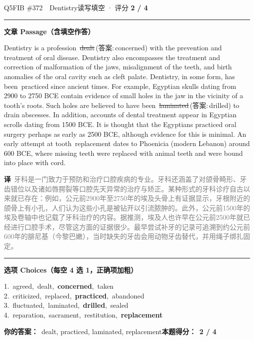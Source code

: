 \documentclass[11pt]{article}
\newcommand{\ptesub}[1]{%
  \par\needspace{2\baselineskip}\smallskip
  {\color{cAccent}\rule[-0.2ex]{3pt}{1.05em}}\hspace{6pt}%
  {\bfseries\color{cHead}#1}\par\nopagebreak\smallskip}
\newcommand{\zh}[1]{{\footnotesize\textcolor{cNote}{\textbf{译}}\ \textcolor{gray}{#1}}}
\newcommand{\rok}[1]{{\color{cFix}\ding{51}\,#1}}                 %
\newcommand{\rno}[2]{{\color{cWrong}\ding{55}\,\sout{#1}}\,{\footnotesize\color{cFix}(答案:\,#2)}}  %
\begin{document}
\begin{qblock}{Q5\quad FIB \#372\ \ Dentistry}{读写填空 · 评分 \textcolor{cAccent}{\bfseries 2 / 4}}
\ptesub{文章 Passage（含填空作答）}
\begin{promptbox}
Dentistry is a profession \rno{dealt}{concerned} with the prevention and treatment of oral disease. Dentistry also encompasses the treatment and correction of malformation of the jaws, misalignment of the teeth, and birth anomalies of the oral cavity such as cleft palate. Dentistry, in some form, has been \rok{practiced} since ancient times. For example, Egyptian skulls dating from 2900 to 2750 BCE contain evidence of small holes in the jaw in the vicinity of a tooth's roots. Such holes are believed to have been \rno{laminated}{drilled} to drain abscesses. In addition, accounts of dental treatment appear in Egyptian scrolls dating from 1500 BCE. It is thought that the Egyptians practiced oral surgery perhaps as early as 2500 BCE, although evidence for this is minimal. An early attempt at tooth \rok{replacement} dates to Phoenicia (modern Lebanon) around 600 BCE, where missing teeth were replaced with animal teeth and were bound into place with cord.
\end{promptbox}
\zh{牙科是一门致力于预防和治疗口腔疾病的专业。牙科还涵盖了对颌骨畸形、牙齿错位以及诸如唇腭裂等口腔先天异常的治疗与矫正。某种形式的牙科诊疗自古以来就已存在：例如，公元前2900年至2750年的埃及头骨上有证据显示，牙根附近的颌骨上有小孔，人们认为这些小孔是被钻开以引流脓肿的。此外，公元前1500年的埃及卷轴中也记载了牙科治疗的内容。据推测，埃及人也许早在公元前2500年就已经进行口腔手术，尽管这方面的证据很少。最早尝试补牙的记录可追溯到约公元前600年的腓尼基（今黎巴嫩），当时缺失的牙齿会用动物牙齿替代，并用绳子绑扎固定。}
\ptesub{选项 Choices（每空 4 选 1，正确项加粗）}
{\small
1.\ agreed,\ dealt,\ \textbf{concerned},\ taken\\
2.\ criticized,\ replaced,\ \textbf{practiced},\ abandoned\\
3.\ fluctuated,\ laminated,\ \textbf{drilled},\ sealed\\
4.\ reparation,\ sacrament,\ restitution,\ \textbf{replacement}}
\par\smallskip
\textbf{你的答案：}\ {\color{cWrong}dealt}, practiced, {\color{cWrong}laminated}, replacement\qquad\textbf{本题得分：}\ {\color{cAccent}\bfseries 2 / 4}
\end{qblock}
\end{document}
